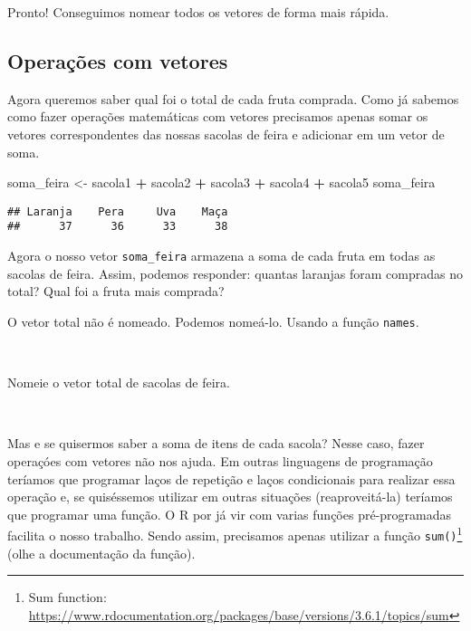 \documentclass[]{book}
\newenvironment{Shaded}{\begin{snugshade}}{\end{snugshade}}
\newcommand{\NormalTok}[1]{#1}
\newcommand{\OperatorTok}[1]{\textcolor[rgb]{0.81,0.36,0.00}{\textbf{#1}}}
\newcommand{\StringTok}[1]{\textcolor[rgb]{0.31,0.60,0.02}{#1}}
\let\rmarkdownfootnote\footnote%
\def\footnote{\protect\rmarkdownfootnote}
\theoremstyle{definition}
\theoremstyle{definition}
\theoremstyle{definition}
\theoremstyle{remark}
\let\BeginKnitrBlock\begin \let\EndKnitrBlock\end
\begin{document}
Pronto! Conseguimos nomear todos os vetores de forma mais rápida.

\hypertarget{operauxe7uxf5es-com-vetores}{%
\subsection{Operações com vetores}\label{operauxe7uxf5es-com-vetores}}

Agora queremos saber qual foi o total de cada fruta comprada. Como já sabemos como fazer operações matemáticas com vetores precisamos apenas somar os vetores correspondentes das nossas sacolas de feira e adicionar em um vetor de soma.

\begin{Shaded}
\begin{Highlighting}[]
\NormalTok{soma_feira <-}\StringTok{ }\NormalTok{sacola1 }\OperatorTok{+}\StringTok{ }\NormalTok{sacola2 }\OperatorTok{+}\StringTok{ }\NormalTok{sacola3 }\OperatorTok{+}\StringTok{ }\NormalTok{sacola4 }\OperatorTok{+}\StringTok{ }\NormalTok{sacola5}
\NormalTok{soma_feira}
\end{Highlighting}
\end{Shaded}

\begin{verbatim}
## Laranja    Pera     Uva    Maça 
##      37      36      33      38
\end{verbatim}

Agora o nosso vetor \texttt{soma\_feira} armazena a soma de cada fruta em todas as sacolas de feira. Assim, podemos responder: quantas laranjas foram compradas no total? Qual foi a fruta mais comprada?

O vetor total não é nomeado. Podemos nomeá-lo. Usando a função \texttt{names}.

~
\BeginKnitrBlock{exercise}
\protect\hypertarget{exr:unnamed-chunk-29}{}{\label{exr:unnamed-chunk-29} }Nomeie o vetor total de sacolas de feira.
\EndKnitrBlock{exercise}

~

Mas e se quisermos saber a soma de itens de cada sacola? Nesse caso, fazer operaçóes com vetores não nos ajuda. Em outras linguagens de programação teríamos que programar laços de repetição e laços condicionais para realizar essa operação e, se quiséssemos utilizar em outras situações (reaproveitá-la) teríamos que programar uma função. O R por já vir com varias funções pré-programadas facilita o nosso trabalho. Sendo assim, precisamos apenas utilizar a função \texttt{sum()}\footnote{Sum function: \url{https://www.rdocumentation.org/packages/base/versions/3.6.1/topics/sum}} (olhe a documentação da função).
\end{document}
